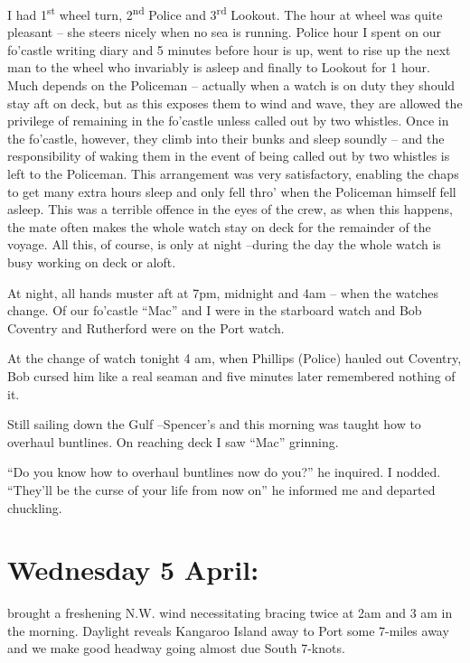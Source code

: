 \documentclass[
  11pt,
  msmallroyalvopaper
]{memoir}
\begin{document}
I had 1\textsuperscript{st} wheel turn, 2\textsuperscript{nd} Police and
3\textsuperscript{rd} Lookout. The hour at wheel was quite pleasant --
she steers nicely when no sea is running. Police hour I spent on our
fo'castle writing diary and 5 minutes before hour is up, went to rise up
the next man to the wheel who invariably is asleep and finally to
Lookout for 1 hour. Much depends on the Policeman -- actually when a
watch is on duty they should stay aft on deck, but as this exposes them
to wind and wave, they are allowed the privilege of remaining in the
fo'castle unless called out by two whistles. Once in the fo'castle,
however, they climb into their bunks and sleep soundly -- and the
responsibility of waking them in the event of being called out by two
whistles is left to the Policeman. This arrangement was very
satisfactory, enabling the chaps to get many extra hours sleep and only
fell thro' when the Policeman himself fell asleep. This was a terrible
offence in the eyes of the crew, as when this happens, the mate often
makes the whole watch stay on deck for the remainder of the voyage. All
this, of course, is only at night --during the day the whole watch is
busy working on deck or aloft.

At night, all hands muster aft at 7pm, midnight and 4am -- when the
watches change. Of our fo'castle ``Mac'' and I were in the starboard
watch and Bob Coventry and Rutherford were on the Port watch.

At the change of watch tonight 4 am, when Phillips (Police) hauled out
Coventry, Bob cursed him like a real seaman and five minutes later
remembered nothing of it.

Still sailing down the Gulf --Spencer's and this morning was taught how
to overhaul buntlines. On reaching deck I saw ``Mac'' grinning.

``Do you know how to overhaul buntlines now do you?'' he inquired. I
nodded. ``They'll be the curse of your life from now on'' he informed me
and departed chuckling.

\hypertarget{wednesday-5-april}{%
\section{Wednesday 5 April:}\label{wednesday-5-april}}

brought a freshening N.W. wind necessitating bracing twice at 2am and 3
am in the morning. Daylight reveals Kangaroo Island away to Port some
7-miles away and we make good headway going almost due South 7-knots.
\end{document}
